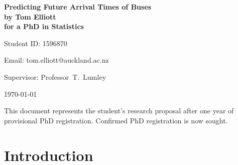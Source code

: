 \documentclass[12pt,a4paper]{article}
\begin{document}
\begin{Large}
\begin{center}
\textbf{Predicting Future Arrival Times of Buses} \\
\textbf{by Tom Elliott} \\
\textbf{for a PhD in Statistics}
\end{center}
\end{Large}


\hfill{Student ID: 1596870}

\hfill{Email: tom.elliott@auckland.ac.nz}

Supervisor: Professor~T.~Lumley





\begin{center}
\today
\end{center}


This document represents the student's research proposal after
one year of provisional PhD registration.
Confirmed PhD registration is now sought.




\section{Introduction}
\label{sec:intro}








\end{document}
